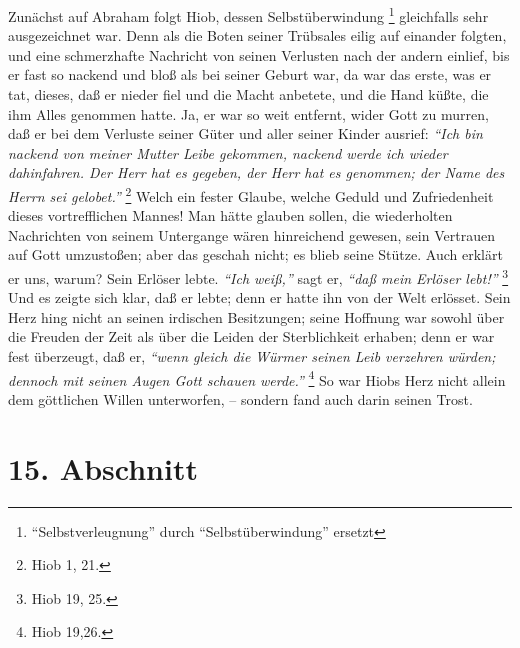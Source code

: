 Zunächst auf Abraham folgt Hiob,  dessen Selbstüberwindung
\footnote{"`Selbstverleugnung"' durch "`Selbstüberwindung"' ersetzt} gleichfalls
sehr
ausgezeichnet war. Denn als die Boten seiner Trübsales eilig auf einander
folgten, und eine schmerzhafte Nachricht von seinen Verlusten nach der andern
einlief, bis er fast so nackend und bloß als bei seiner Geburt war, da war das
erste, was er tat, dieses, daß er nieder fiel und die Macht anbetete, und die
Hand küßte, die ihm Alles genommen hatte. Ja, er war so weit entfernt, wider
Gott zu murren, daß er bei dem Verluste seiner Güter und aller seiner Kinder
ausrief:
\textit{"`Ich bin nackend von meiner Mutter Leibe gekommen, nackend werde ich
wieder dahinfahren. Der Herr hat es gegeben, der Herr hat es genommen; der Name
des Herrn sei gelobet."'}
\footnote{Hiob 1, 21.}
Welch ein fester Glaube, welche
Geduld und Zufriedenheit dieses vortrefflichen Mannes! Man hätte glauben sollen,
die wiederholten Nachrichten von seinem Untergange wären hinreichend gewesen,
sein Vertrauen auf Gott umzustoßen; aber das geschah nicht; es blieb seine
Stütze. Auch erklärt er uns, warum? Sein Erlöser lebte.
\textit{"`Ich weiß,"'} sagt er,
\textit{"`daß mein Erlöser lebt!"'}
\footnote{Hiob 19, 25.}
Und es zeigte sich
klar, daß er lebte; denn er hatte ihn von der Welt erlösset. Sein Herz hing
nicht an seinen irdischen Besitzungen; seine Hoffnung war sowohl über die
Freuden der Zeit als über die Leiden der Sterblichkeit erhaben; denn er war fest
überzeugt, daß er,
\textit{"`wenn gleich die Würmer seinen Leib verzehren würden;
dennoch mit seinen Augen Gott schauen werde."'}
\footnote{Hiob 19,26.}
So war Hiobs
Herz nicht allein dem göttlichen Willen unterworfen, – sondern fand auch darin
seinen Trost. 

\section{15. Abschnitt} \label{kap4_ab15}

